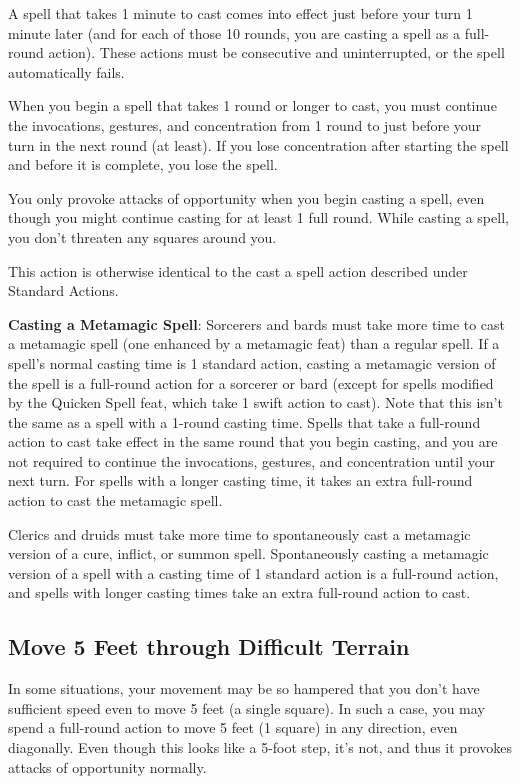 A spell that takes 1 minute to cast comes into effect just before your turn 1 minute later (and for each of those 10 rounds, you are casting a spell as a full-round action). These actions must be consecutive and uninterrupted, or the spell automatically fails.
				
When you begin a spell that takes 1 round or longer to cast, you must continue the invocations, gestures, and concentration from 1 round to just before your turn in the next round (at least). If you lose concentration after starting the spell and before it is complete, you lose the spell.
				
You only provoke attacks of opportunity when you begin casting a spell, even though you might continue casting for at least 1 full round. While casting a spell, you don't threaten any squares around you.
				
This action is otherwise identical to the cast a spell action described under Standard Actions.
				
\textbf{Casting a Metamagic Spell}: Sorcerers and bards must take more time to cast a metamagic spell (one enhanced by a metamagic feat) than a regular spell. If a spell's normal casting time is 1 standard action, casting a metamagic version of the spell is a full-round action for a sorcerer or bard (except for spells modified by the Quicken Spell feat, which take 1 swift action to cast). Note that this isn't the same as a spell with a 1-round casting time. Spells that take a full-round action to cast take effect in the same round that you begin casting, and you are not required to continue the invocations, gestures, and concentration until your next turn. For spells with a longer casting time, it takes an extra full-round action to cast the metamagic spell.
				
Clerics and druids must take more time to spontaneously cast a metamagic version of a cure, inflict, or summon spell. Spontaneously casting a metamagic version of a spell with a casting time of 1 standard action is a full-round action, and spells with longer casting times take an extra full-round action to cast.
				
\subsection{Move 5 Feet through Difficult Terrain}

				
In some situations, your movement may be so hampered that you don't have sufficient speed even to move 5 feet (a single square). In such a case, you may spend a full-round action to move 5 feet (1 square) in any direction, even diagonally. Even though this looks like a 5-foot step, it's not, and thus it provokes attacks of opportunity normally.
				
